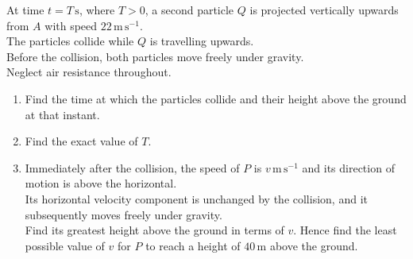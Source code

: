 \documentclass[leqno]{article}
\begin{document}
\begin{enumerate}[
  label=\textbf{\arabic*.},
  leftmargin=*,
  topsep=0pt,
  partopsep=0pt,
  parsep=0pt
]
At time $t=T\,\mathrm{s}$, where $T>0$, a second particle $Q$ is projected vertically upwards from $A$ with speed $22\,\mathrm{m\,s^{-1}}$. \\
The particles collide while $Q$ is travelling upwards. \\
Before the collision, both particles move freely under gravity. \\
Neglect air resistance throughout. \\

\begin{enumerate}[label=\textbf{(\alph*)}]
\item Find the time at which the particles collide and their height above the ground at that instant.  \\
\item Find the exact value of $T$.  \\
\item Immediately after the collision, the speed of $P$ is $v\,\mathrm{m\,s^{-1}}$ and its direction of motion is above the horizontal. \\
Its horizontal velocity component is unchanged by the collision, and it subsequently moves freely under gravity. \\
Find its greatest height above the ground in terms of $v$. Hence find the least possible value of $v$ for $P$ to reach a height of $40\,\mathrm{m}$ above the ground.  \\
\end{enumerate}

\vspace*{10pt}

\begin{djsSolution}
\begin{djsSolutionFigure}
\end{djsSolutionFigure}
\end{djsSolution}
\end{enumerate}
\end{document}
